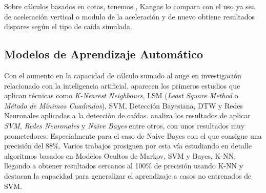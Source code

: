 Sobre cálculos basados en cotas, tenemos \cite{fallindex00}, Kangas\cite{Kangas2008} lo compara con el uso ya sea de aceleración vertical o modulo de la aceleración y de nuevo obtiene resultados dispares según el tipo de caída simulada.


\fi


\subsection{Modelos de Aprendizaje Automático}\label{sec:arte:modelos_ml}

Con el aumento en la capacidad de cálculo sumado al auge en investigación relacionado con la inteligencia artificial, aparecen los primeros estudios que aplican técnicas como \textit{K-Nearest Neighbours}, LSM (\textit{Least Square Method} o \textit{Método de Mínimos Cuadrados}), SVM, Detección Bayesiana, DTW y Redes Neuronales aplicadas a la detección de caídas.  analiza los resultados de aplicar \textit{SVM}, \textit{Redes Neuronales} y \textit{Naive Bayes} entre otros, con unos resultados muy prometedores. Especialmente para el caso de Naive Bayes con el que consigue una precisión del 88\%. Varios trabajos \cite{Luque2014,ReyesOrtiz2014,tfall,Ozdemir2014} prosiguen por esta vía estudiando en detalle algoritmos basados en Modelos Ocultos de Markov, SVM y Bayes, K-NN, llegando a obtener resultados cercanos al 100\% de precisión usando K-NN \cite{Ozdemir2014} y destacan la capacidad para generalizar el aprendizaje a casos no entrenados de SVM\cite{tfall, Aziz2017b}.

